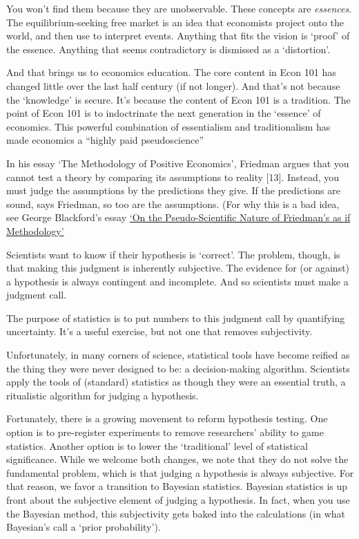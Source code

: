 \documentclass[
]{book}
\begin{document}
You won't find them because they are unobservable. These concepts are \emph{essences}. The equilibrium-seeking free market is an idea that economists project onto the world, and then use to interpret events. Anything that fits the vision is `proof' of the essence. Anything that seems contradictory is dismissed as a `distortion'.

And that brings us to economics education. The core content in Econ 101 has changed little over the last half century (if not longer). And that's not because the `knowledge' is secure. It's because the content of Econ 101 is a tradition. The point of Econ 101 is to indoctrinate the next generation in the `essence' of economics. This powerful combination of essentialism and traditionalism has made economics a ``highly paid pseudoscience''

In his essay `The Methodology of Positive Economics', Friedman argues that you cannot test a theory by comparing its assumptions to reality {[}13{]}. Instead, you must judge the assumptions by the predictions they give. If the predictions are sound, says Friedman, so too are the assumptions. (For why this is a bad idea, see George Blackford's essay
\href{https://www.rweconomics.com/BPA.htm}{`On the Pseudo-Scientific Nature of Friedman's as if Methodology'}

Scientists want to know if their hypothesis is `correct'. The problem, though, is that making this judgment is inherently subjective. The evidence for (or against) a hypothesis is always contingent and incomplete. And so scientists must make a judgment call.

The purpose of statistics is to put numbers to this judgment call by quantifying uncertainty. It's a useful exercise, but not one that removes subjectivity.

Unfortunately, in many corners of science, statistical tools have become reified as the thing they were never designed to be: a decision-making algorithm. Scientists apply the tools of (standard) statistics as though they were an essential truth, a ritualistic algorithm for judging a hypothesis.

Fortunately, there is a growing movement to reform hypothesis testing. One option is to pre-register experiments to remove researchers' ability to game statistics. Another option is to lower the `traditional' level of statistical significance.
While we welcome both changes, we note that they do not solve the fundamental problem, which is that judging a hypothesis is always subjective.
For that reason, we favor a transition to Bayesian statistics.
Bayesian statistics is up front about the subjective element of judging a hypothesis. In fact, when you use the Bayesian method, this subjectivity gets baked into the calculations (in what Bayesian's call a `prior probability').
\end{document}
